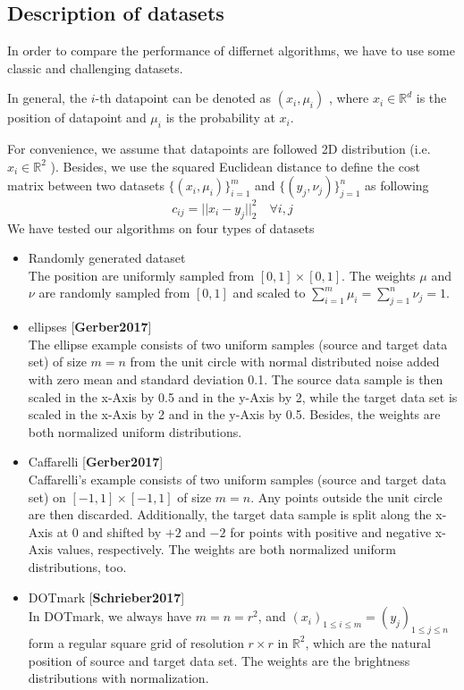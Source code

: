\documentclass{article}
\begin{document}
\subsection{Description of datasets}
In order to compare the performance of differnet algorithms, we have to use some classic and challenging datasets.

In general, the $i$-th datapoint can be denoted as $(x_{i},\mu_{i})$ , where $x_{i}\in \mathbb{R}^{d}$ is the position of datapoint and $\mu_{i}$ is the probability at $x_{i}$.

For convenience, we assume that datapoints are followed 2D distribution (i.e. $x_{i}\in \mathbb{R}^{2}$ ). Besides, we use the squared Euclidean distance to define the cost matrix between two datasets $\{(x_{i},\mu_{i})\}_{i=1}^{m}$ and $\{(y_{j},\nu_{j})\}_{j=1}^{n}$ as following
\begin{equation}
  c_{ij}=||x_{i}-y_{j}||_{2}^{2}\quad\forall i, j
\end{equation}
We have tested our algorithms on four types of datasets
\begin{itemize}
  \item Randomly generated dataset\\
        The position are uniformly sampled from
        $[0, 1]\times[0, 1]$. The weights $\mu$ and $\nu$ are randomly sampled from $[0, 1]$ and scaled to $ \sum_{i=1}^{m}{\mu_i} = \sum_{j=1}^{n}{\nu_j} = 1 $.
  \item ellipses [\textbf{Gerber2017}]\\
  The ellipse example consists of two uniform samples (source and target data set) of size $m=n$ from the unit circle
  with normal distributed noise added with zero mean and standard deviation 0.1. The source
  data sample is then scaled in the x-Axis by 0.5 and in the y-Axis by 2, while the target
  data set is scaled in the x-Axis by 2 and in the y-Axis by 0.5.
  Besides, the weights are both normalized uniform distributions.
  \item Caffarelli [\textbf{Gerber2017}]\\
  Caffarelli’s example consists of two uniform samples (source and target data set) on $[-1, 1]\times[-1, 1]$  of size $m=n$. Any points outside the unit circle are then
discarded. Additionally, the target data sample is split along the x-Axis at 0 and shifted by
$+2$ and $-2$ for points with positive and negative x-Axis values, respectively. The weights are both normalized uniform distributions, too.
  \item DOTmark [\textbf{Schrieber2017}]\\
  In DOTmark, we always have $m=n=r^{2}$, and $(x_i)_{1\leq i\leq m} = (y_j)_{1\leq j\leq n}$ form a regular square grid of resolution $r\times r$ in $\mathbb{R}^{2}$, which are the natural position of source and target data set. The weights are the brightness distributions with normalization.
\end{itemize}
\end{document}
